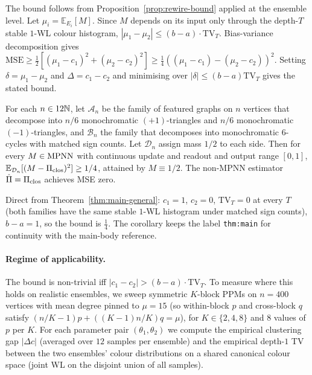 The bound follows from Proposition~\ref{prop:rewire-bound}
applied at the ensemble level. Let $\mu_i = \mathbb{E}_{E_i}[M]$.
Since $M$ depends on its input only through the depth-$T$
stable $1$-WL colour histogram, $|\mu_1 - \mu_2| \le (b - a)
\cdot \mathrm{TV}_T$. Bias-variance decomposition gives
$\mathrm{MSE} \ge \tfrac{1}{2}[(\mu_1 - c_1)^2 + (\mu_2 -
c_2)^2] \ge \tfrac{1}{4}((\mu_1 - c_1) - (\mu_2 - c_2))^2$.
Setting $\delta = \mu_1 - \mu_2$ and $\Delta = c_1 - c_2$ and
minimising over $|\delta| \le (b - a) \mathrm{TV}_T$ gives the
stated bound.

\begin{corollary}\label{thm:main}
For each $n \in 12\mathbb{N}$, let $\mathcal{A}_n$ be the family of
featured graphs on $n$ vertices that decompose into $n/6$
monochromatic $(+1)$-triangles and $n/6$ monochromatic
$(-1)$-triangles, and $\mathcal{B}_n$ the family that decomposes
into monochromatic $6$-cycles with matched sign counts. Let
$\mathcal{D}_n$ assign mass $1/2$ to each side. Then for every
$M \in \mathrm{MPNN}$ with continuous update and readout and output
range $[0, 1]$,
$\mathbb{E}_{\mathcal{D}_n}[(M - \Pi_{\mathrm{clos}})^2] \ge 1/4$,
attained by $M \equiv 1/2$. The non-MPNN estimator
$\hat{\Pi} = \Pi_{\mathrm{clos}}$ achieves MSE zero.
\end{corollary}

Direct from Theorem~\ref{thm:main-general}: $c_1 = 1$, $c_2 = 0$,
$\mathrm{TV}_T = 0$ at every $T$ (both families have the same
stable $1$-WL histogram under matched sign counts), $b - a = 1$,
so the bound is $\tfrac{1}{4}$. The corollary keeps the label
\texttt{thm:main} for continuity with the main-body reference.

\paragraph{Regime of applicability.} The bound is non-trivial
iff $|c_1 - c_2| > (b - a) \cdot \mathrm{TV}_T$. To measure
where this holds on realistic ensembles, we sweep symmetric
$K$-block PPMs on $n = 400$ vertices with mean degree pinned to
$\mu = 15$ (so within-block $p$ and cross-block $q$ satisfy
$(n/K - 1) p + ((K-1)n/K) q = \mu$), for $K \in \{2, 4, 8\}$
and $8$ values of $p$ per $K$. For each parameter pair
$(\theta_1, \theta_2)$ we compute the empirical clustering gap
$|\Delta c|$ (averaged over $12$ samples per ensemble) and the
empirical depth-$1$ TV between the two ensembles' colour
distributions on a shared canonical colour space
(joint WL on the disjoint union of all samples).

